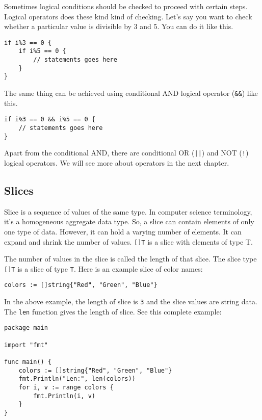 Sometimes logical conditions should be checked to proceed with certain
steps.  Logical operators does these kind kind of checking.  Let's
say you want to check whether a particular value is divisible by 3
and 5.  You can do it like this.

\begin{lstlisting}[numbers=none]
if i%3 == 0 {
    if i%5 == 0 {
        // statements goes here
    }
}
\end{lstlisting}

The same thing can be achieved using conditional AND logical operator
(\texttt{\&\&}) like this.

\begin{lstlisting}[numbers=none]
if i%3 == 0 && i%5 == 0 {
    // statements goes here
}
\end{lstlisting}

Apart from the conditional AND, there are conditional OR (\texttt{||})
and NOT (\texttt{!}) logical operators.  We will see more about
operators in the next chapter.


\subsection{Slices}

Slice is a sequence of values of the same type.  In
computer science terminology, it's a homogeneous aggregate data type.
So, a slice can contain elements of only one type of data.  However,
it can hold a varying number of elements.  It can expand and shrink
the number of values.  \texttt{[]T} is a slice with elements of type
T.

The number of values in the slice is called the length of that slice.
The slice type \texttt{[]T} is a slice of type \texttt{T}.  Here is an
example slice of color names:

\begin{lstlisting}[numbers=none]
colors := []string{"Red", "Green", "Blue"}
\end{lstlisting}

In the above example, the length of slice is \texttt{3} and the slice
values are string data.  The \texttt{len} function gives the length of
slice.  See this complete example:

\begin{lstlisting}[caption=Printing slice values]
package main

import "fmt"

func main() {
    colors := []string{"Red", "Green", "Blue"}
    fmt.Println("Len:", len(colors))
    for i, v := range colors {
        fmt.Println(i, v)
    }
}
\end{lstlisting}

